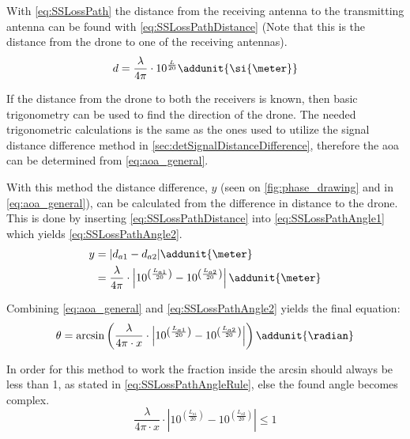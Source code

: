 With \autoref{eq:SSLossPath} the distance from the receiving antenna to the transmitting antenna can be found with \autoref{eq:SSLossPathDistance} (Note that this is the distance from the drone to one of the receiving antennas). 
\begin{equation} \label{eq:SSLossPathDistance} 
d = \frac{\lambda}{4\pi} \cdot 10^{\frac{L}{20}} \addunit{\si{\meter}}
\end{equation}

If the distance from the drone to both the receivers is known, then basic trigonometry can be used to find the direction of the drone. The needed trigonometric calculations is the same as the ones used to utilize the signal distance difference method in \autoref{sec:detSignalDistanceDifference}, therefore the \gls{aoa} can be determined from \autoref{eq:aoa_general}. 

With this method the distance difference, $y$ (seen on \autoref{fig:phase_drawing} and in \autoref{eq:aoa_general}), can be calculated from the difference in distance to the drone. This is done by inserting \autoref{eq:SSLossPathDistance} into \autoref{eq:SSLossPathAngle1} which yields \autoref{eq:SSLossPathAngle2}. 
\begin{align}
y &= | d_{a1} - d_{a2} | \addunit{\meter} \label{eq:SSLossPathAngle1} \\
  &= \frac{\lambda}{4\pi} \cdot \left| 10^{\left(\frac{L_{a1}}{20}\right)} - 10^{\left(\frac{L_{a2}}{20}\right)} \right| \addunit{\meter} \label{eq:SSLossPathAngle2}
\end{align}
\startexplain
{}
\stopexplain

Combining \autoref{eq:aoa_general} and \autoref{eq:SSLossPathAngle2} yields the final equation:
\begin{equation} \label{eq:SSLossPathAngleFinal}
	\theta = \arcsin\left( \frac{\lambda}{4\pi \cdot x} \cdot \left| 10^{\left(\frac{L_{a1}}{20}\right)} - 10^{\left(\frac{L_{a2}}{20}\right)} \right|  \right) \addunit{\radian}
\end{equation}
\startexplain
{}
\stopexplain

In order for this method to work the fraction inside the arcsin should always be less than 1, as stated in \autoref{eq:SSLossPathAngleRule}, else the found angle becomes complex. 
\begin{equation} \label{eq:SSLossPathAngleRule}
\frac{\lambda}{4\pi \cdot x} \cdot \left| 10^{\left(\frac{L_{a1}}{20}\right)} - 10^{\left(\frac{L_{a2}}{20}\right)} \right| \leq 1
\end{equation}

